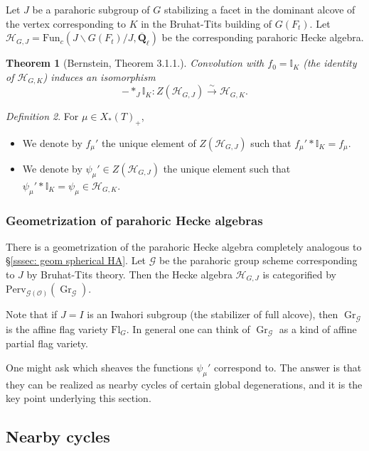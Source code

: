 \documentclass[reqno]{amsart}
\numberwithin{equation}{section}
\newcommand{\Q}{\mathbf{Q}}
\newcommand{\ol}[1]{\overline{#1}}
\newcommand{\mbb}[1]{\mathbb{#1}}
\newcommand{\Cal}[1]{\mathcal{#1}}
\newcommand{\co}{\colon}
\newcommand{\mrm}[1]{\mathrm{#1}}
\newcommand{\bs}{\backslash}
\DeclareMathOperator{\Gr}{Gr}
\newtheorem{thm}{Theorem}[section]
\theoremstyle{remark}
\newtheorem{defn}[thm]{Definition}
\numberwithin{equation}{section}
\begin{document}
Let $J$ be a parahoric subgroup of $G$ stabilizing a facet in the dominant alcove of the vertex corresponding to $K$ in the Bruhat-Tits building of $G(F_t)$. Let $\Cal{H}_{G,J} = \mrm{Fun}_c(J \bs G(F_t) / J , \ol{\Q}_{\ell})$ be the corresponding parahoric Hecke algebra. 


\begin{thm}[Bernstein, \cite{Haines09} Theorem 3.1.1.]\label{thm: bernstein isom} Convolution with $f_0 = \mbb{I}_K$ (the identity of $\Cal{H}_{G,K}$) induces an isomorphism 
\[
- *_J \mbb{I}_K \co Z(\Cal{H}_{G,J}) \xrightarrow{\sim} \Cal{H}_{G,K}.
\]

\end{thm}

\begin{defn}\label{IC basis hecke algebra}
For $\mu \in X_*(T)_+$, 
\begin{itemize}
\item We denote by $f_{\mu}'$ the unique element of $Z(\Cal{H}_{G,J})$  such that $f_{\mu}' * \mbb{I}_K = f_{\mu}$.
\item We denote by $\psi_{\mu}' \in Z(\Cal{H}_{G,J}) $  the unique element such that  $ \psi_{\mu}' * \mbb{I}_K = \psi_{\mu} \in \Cal{H}_{G,K}$. 
\end{itemize}
\end{defn}


\subsubsection{Geometrization of parahoric Hecke algebras} There is a  geometrization of the parahoric Hecke algebra completely analogous to \S \ref{sssec: geom spherical HA}. Let $\Cal{G}$ be the parahoric group scheme corresponding to $J$ by Bruhat-Tits theory. Then the Hecke algebra $\Cal{H}_{G,J}$ is categorified by $\mrm{Perv}_{\Cal{G}(\Cal{O})}(\Gr_{\Cal{G}})$. 

Note that if $J=I$ is an Iwahori subgroup (the stabilizer of full alcove), then $\Gr_{\Cal{G}}$ is the affine flag variety $\mrm{Fl}_G$. In general one can think of $\Gr_{\Cal{G}}$ as a kind of affine partial flag variety.

One might ask which sheaves the functions $\psi_{\mu}'$ correspond to. The answer is that they can be realized as nearby cycles of certain global degenerations, and it is the key point underlying this section. 



\subsection{Nearby cycles}\label{subsec: nearby cycles}
\end{document}
